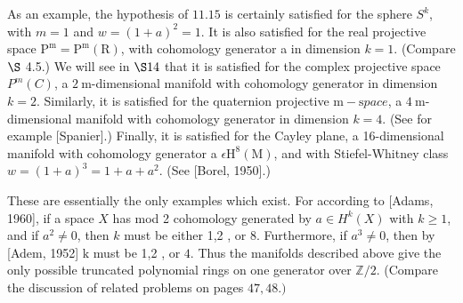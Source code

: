 \documentclass[10pt]{article}
\begin{document}
As an example, the hypothesis of $11.15$ is certainly satisfied for the sphere $S^{k}$, with $m=1$ and $w=(1+a)^{2}=1$. It is also satisfied for the real projective space $\mathrm{P}^{\mathrm{m}}=\mathrm{P}^{\mathrm{m}}(\mathrm{R})$, with cohomology generator a in dimension $k=1$. (Compare $\S$ 4.5.) We will see in $\S 14$ that it is satisfied for the complex projective space $P^{m}(C)$, a $2 \mathrm{~m}$-dimensional manifold with cohomology generator in dimension $k=2$. Similarly, it is satisfied for the quaternion projective $\mathrm{m}-\mathrm{s} p a c e$, a $4 \mathrm{~m}$-dimensional manifold with cohomology generator in dimension $k=4$. (See for example [Spanier].) Finally, it is satisfied for the Cayley plane, a 16-dimensional manifold with cohomology generator a $\epsilon \mathrm{H}^{8}(\mathrm{M})$, and with Stiefel-Whitney class $w=(1+a)^{3}=1+a+a^{2}$. (See [Borel, 1950].)

These are essentially the only examples which exist. For according to [Adams, 1960], if a space $X$ has mod 2 cohomology generated by $a \in H^{k}(X)$ with $k \geq 1$, and if $a^{2} \neq 0$, then $k$ must be either 1,2 , or 8. Furthermore, if $a^{3} \neq 0$, then by [Adem, 1952] $\mathrm{k}$ must be 1,2 , or $4 .$ Thus the manifolds described above give the only possible truncated polynomial rings on one generator over $\mathbb{Z} / 2$. (Compare the discussion of related problems on pages $47,48 .)$
\end{document}
